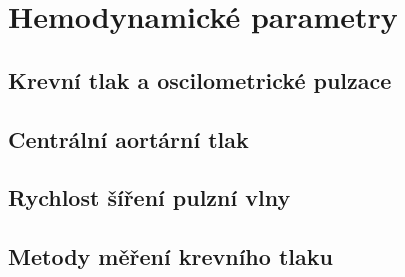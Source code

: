 \chapter{Hemodynamické parametry}
\section{Krevní tlak a oscilometrické pulzace}
\section{Centrální aortární tlak}
\section{Rychlost šíření pulzní vlny}
\section{Metody měření krevního tlaku}